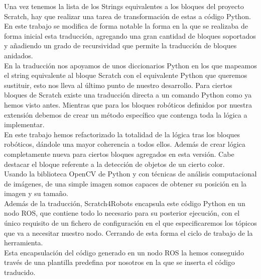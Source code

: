 Una vez tenemos la lista de los Strings equivalentes a los bloques del proyecto Scratch, hay que realizar una tarea de transformación de estas a código Python.\\

En este trabajo se modifica de forma notable la forma en la que se realizaba de forma inicial esta traducción, agregando una gran cantidad de bloques soportados y añadiendo un grado de recursividad que permite la traducción de bloques anidados.\\

En la traducción nos apoyamos de unos diccionarios Python en los que mapeamos el string equivalente al bloque Scratch con el equivalente Python que queremos sustituir, esto nos lleva al último punto de nuestro desarrollo. Para ciertos bloques de Scratch existe una traducción directa a un comando Python como ya hemos visto antes. Mientras que para los bloques robóticos definidos por nuestra extensión debemos de crear un método específico que contenga toda la lógica a implementar.\\

En este trabajo hemos refactorizado la totalidad de la lógica tras los bloques robóticos, dándole una mayor coherencia a todos ellos. Además de crear lógica completamente nueva para ciertos bloques agregados en esta versión. Cabe destacar el bloque referente a la detección de objetos de un cierto color.\\

Usando la biblioteca OpenCV de Python y con técnicas de análisis computacional de imágenes, de una simple imagen somos capaces de obtener su posición en la imagen y su tamaño.\\

Además de la traducción, Scratch4Robots encapsula este código Python en un nodo ROS, que contiene todo lo necesario para su posterior ejecución, con el único requisito de un fichero de configuración en el que especificaremos los tópicos que va a necesitar nuestro nodo. Cerrando de esta forma el ciclo de trabajo de la herramienta.\\




Esta encapsulación del código generado en un nodo ROS la hemos conseguido través de una plantilla predefina por nosotros en la que se inserta el código traducido.

